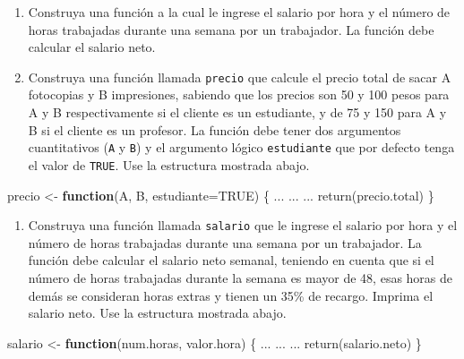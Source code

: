 \documentclass[
]{book}
\makeatletter
\newenvironment{Shaded}{\begin{snugshade}}{\end{snugshade}}
\newcommand{\AttributeTok}[1]{\textcolor[rgb]{0.77,0.63,0.00}{#1}}
\newcommand{\ConstantTok}[1]{\textcolor[rgb]{0.00,0.00,0.00}{#1}}
\newcommand{\ControlFlowTok}[1]{\textcolor[rgb]{0.13,0.29,0.53}{\textbf{#1}}}
\newcommand{\FunctionTok}[1]{\textcolor[rgb]{0.00,0.00,0.00}{#1}}
\newcommand{\NormalTok}[1]{#1}
\newcommand{\OtherTok}[1]{\textcolor[rgb]{0.56,0.35,0.01}{#1}}
\providecommand{\tightlist}{%
  \setlength{\itemsep}{0pt}\setlength{\parskip}{0pt}}
\newenvironment{kframe}{%
\medskip{}
\setlength{\fboxsep}{.8em}
 \def\at@end@of@kframe{}%
 \ifinner\ifhmode%
  \def\at@end@of@kframe{\end{minipage}}%
  \begin{minipage}{\columnwidth}%
 \fi\fi%
 \def\FrameCommand##1{\hskip\@totalleftmargin \hskip-\fboxsep
 \colorbox{shadecolor}{##1}\hskip-\fboxsep
     \hskip-\linewidth \hskip-\@totalleftmargin \hskip\columnwidth}%
 \MakeFramed {\advance\hsize-\width
   \@totalleftmargin\z@ \linewidth\hsize
   \@setminipage}}%
 {\par\unskip\endMakeFramed%
 \at@end@of@kframe}
\renewenvironment{Shaded}{\begin{kframe}}{\end{kframe}}
\makeatother
\begin{document}
\begin{enumerate}
\def\labelenumi{\arabic{enumi}.}
\setcounter{enumi}{5}
\item
  Construya una función a la cual le ingrese el salario por hora y el número de horas trabajadas durante una semana por un trabajador. La función debe calcular el salario neto.
\item
  Construya una función llamada \texttt{precio} que calcule el precio total de sacar A fotocopias y B impresiones, sabiendo que los precios son 50 y 100 pesos para A y B respectivamente si el cliente es un estudiante, y de 75 y 150 para A y B si el cliente es un profesor. La función debe tener dos argumentos cuantitativos (\texttt{A} y \texttt{B}) y el argumento lógico \texttt{estudiante} que por defecto tenga el valor de \texttt{TRUE}. Use la estructura mostrada abajo.
\end{enumerate}

\begin{Shaded}
\begin{Highlighting}[]
\NormalTok{precio }\OtherTok{\textless{}{-}} \ControlFlowTok{function}\NormalTok{(A, B, }\AttributeTok{estudiante=}\ConstantTok{TRUE}\NormalTok{) \{}
\NormalTok{  ...}
\NormalTok{  ...}
\NormalTok{  ...}
  \FunctionTok{return}\NormalTok{(precio.total)}
\NormalTok{\}}
\end{Highlighting}
\end{Shaded}

\begin{enumerate}
\def\labelenumi{\arabic{enumi}.}
\setcounter{enumi}{7}
\tightlist
\item
  Construya una función llamada \texttt{salario} que le ingrese el salario por hora y el número de horas trabajadas durante una semana por un trabajador. La función debe calcular el salario neto semanal, teniendo en cuenta que si el número de horas trabajadas durante la semana es mayor de 48, esas horas de demás se consideran horas extras y tienen un 35\% de recargo. Imprima el salario neto. Use la estructura mostrada abajo.
\end{enumerate}

\begin{Shaded}
\begin{Highlighting}[]
\NormalTok{salario }\OtherTok{\textless{}{-}} \ControlFlowTok{function}\NormalTok{(num.horas, valor.hora) \{}
\NormalTok{  ...}
\NormalTok{  ...}
\NormalTok{  ...}
  \FunctionTok{return}\NormalTok{(salario.neto)}
\NormalTok{\}}
\end{Highlighting}
\end{Shaded}
\end{document}
